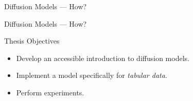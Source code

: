 \documentclass[aspectratio=169]{beamer}
\begin{document}
    \begin{frame}[fragile]{Diffusion Models — How?}
    \end{frame}


    \begin{frame}[fragile]{Diffusion Models — How?}
    \end{frame}

    \begin{frame}[fragile]{Thesis Objectives}
        \begin{itemize}
            \item Develop an accessible introduction to diffusion models.
            \item Implement a model specifically for \textit{tabular data}.
            \item Perform experiments. 
        \end{itemize}
    \end{frame}
\end{document}
